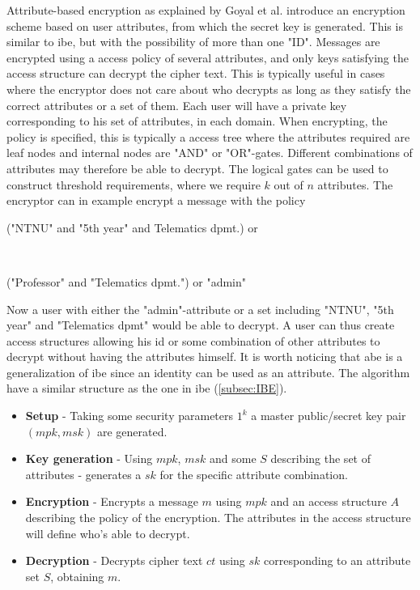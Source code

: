 Attribute-based encryption as explained by Goyal et al. \cite{ABE} introduce an encryption scheme based on user attributes, from which the secret key is generated. This is similar to \gls{ibe}, but with the possibility of more than one "ID". Messages are encrypted using a access policy of several attributes, and only keys satisfying the access structure can decrypt the cipher text. This is typically useful in cases where the encryptor does not care about who decrypts as long as they satisfy the correct attributes or a set of them. Each user will have a private key corresponding to his set of attributes, in each domain. When encrypting, the policy is specified, this is typically a access tree where the attributes required are leaf nodes and internal nodes are "AND" or "OR"-gates. Different combinations of attributes may therefore be able to decrypt. The logical gates can be used to construct threshold requirements, where we require $k$ out of $n$ attributes. The encryptor can in example encrypt a message with the policy\\ \centerline{("NTNU" and "5th year" and Telematics dpmt.) or} \\ \centerline{("Professor" and "Telematics dpmt.") or "admin"}
Now a user with either the "admin"-attribute or a set including "NTNU", "5th year" and "Telematics dpmt" would be able to decrypt. A user can thus create access structures allowing his id or some combination of other attributes to decrypt without having the attributes himself. It is worth noticing that \gls{abe} is a generalization of \gls{ibe} since an identity can be used as an attribute. The algorithm  have a similar structure as the one in \gls{ibe} (\ref{subsec:IBE}).

\begin{itemize}
\item \textbf{ Setup } - Taking some security parameters $1^k$ a master public/secret key pair $(mpk, msk)$ are generated.
\item \textbf{ Key generation } - Using $mpk$, $msk$ and some $S$ describing the set of attributes - generates a $sk$ for the specific attribute combination. 
\item \textbf{ Encryption } - Encrypts a message $m$ using $mpk$ and an access structure $A$ describing the policy of the encryption. The attributes in the access structure will define who's able to decrypt. 
\item \textbf{ Decryption } - Decrypts cipher text $ct$ using $sk$ corresponding to an attribute set $S$, obtaining $m$. 
\end{itemize}


